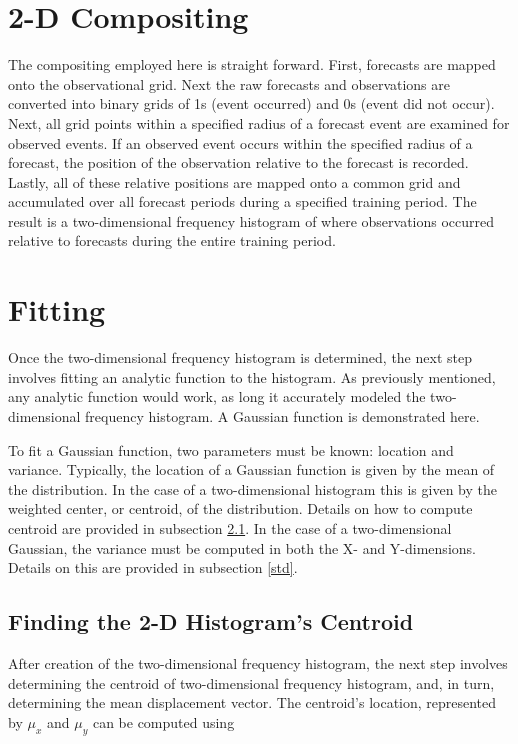 \section{2-D Compositing}
\label{compositing}

The compositing employed here is straight forward.
First, forecasts are mapped onto the observational grid.
Next the raw forecasts and observations are converted into binary grids of 1s (event occurred) and 0s (event did not occur).
Next, all grid points within a specified radius of a forecast event are examined for observed events.
If an observed event occurs within the specified radius of a forecast, the position of the observation relative to the forecast is recorded.
Lastly, all of these relative positions are mapped onto a common grid and accumulated over all forecast periods during a specified training period.
The result is a two-dimensional frequency histogram of where observations occurred relative to forecasts during the entire training period.




\section{Fitting}
\label{fitting}

Once the two-dimensional frequency histogram is determined, the next step involves fitting an analytic function to the histogram.
As previously mentioned, any analytic function would work, as long it accurately modeled the two-dimensional frequency histogram.
A Gaussian function is demonstrated here.

To fit a Gaussian function, two parameters must be known: location and variance.
Typically, the location of a Gaussian function is given by the mean of the distribution.
In the case of a two-dimensional histogram this is given by the weighted center, or centroid, of the distribution.
Details on how to compute centroid are provided in subsection \ref{centroid}.
In the case of a two-dimensional Gaussian, the variance must be computed in both the X- and Y-dimensions.
Details on this are provided in subsection \ref{std}.




\subsection{Finding the 2-D Histogram's Centroid}
\label{centroid}

After creation of the two-dimensional frequency histogram, the next step involves determining the centroid of two-dimensional frequency histogram, and, in turn, determining the mean displacement vector.
The centroid's location, represented by $\mu_x$ and $\mu_y$ can be computed using

